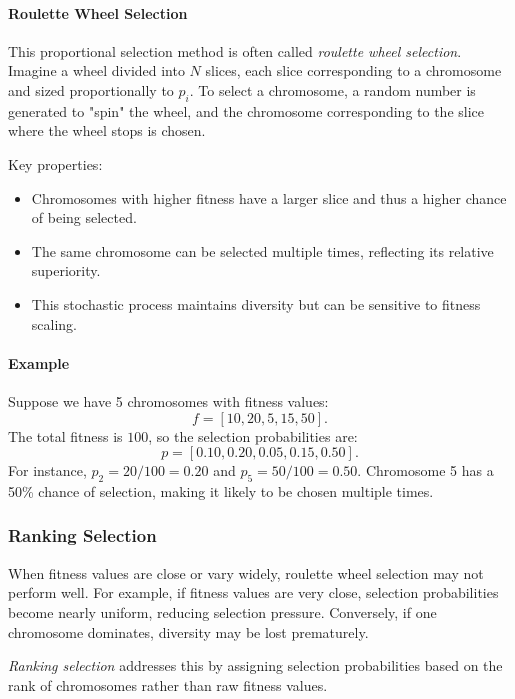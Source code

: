 \paragraph{Roulette Wheel Selection}

This proportional selection method is often called \emph{roulette wheel selection}. Imagine a wheel divided into $N$ slices, each slice corresponding to a chromosome and sized proportionally to $p_i$. To select a chromosome, a random number is generated to "spin" the wheel, and the chromosome corresponding to the slice where the wheel stops is chosen.

Key properties:
\begin{itemize}
    \item Chromosomes with higher fitness have a larger slice and thus a higher chance of being selected.
    \item The same chromosome can be selected multiple times, reflecting its relative superiority.
    \item This stochastic process maintains diversity but can be sensitive to fitness scaling.
\end{itemize}

\paragraph{Example}

Suppose we have 5 chromosomes with fitness values:
\[
f = [10, 20, 5, 15, 50].
\]
The total fitness is $100$, so the selection probabilities are:
\[
p = [0.10, 0.20, 0.05, 0.15, 0.50].
\]
For instance, \(p_2 = 20/100 = 0.20\) and \(p_5 = 50/100 = 0.50\).
Chromosome 5 has a 50\% chance of selection, making it likely to be chosen multiple times.

\subsubsection{Ranking Selection}
\label{sec:evo_ranking_selection_sub}

When fitness values are close or vary widely, roulette wheel selection may not perform well. For example, if fitness values are very close, selection probabilities become nearly uniform, reducing selection pressure. Conversely, if one chromosome dominates, diversity may be lost prematurely.

\emph{Ranking selection} addresses this by assigning selection probabilities based on the rank of chromosomes rather than raw fitness values.

